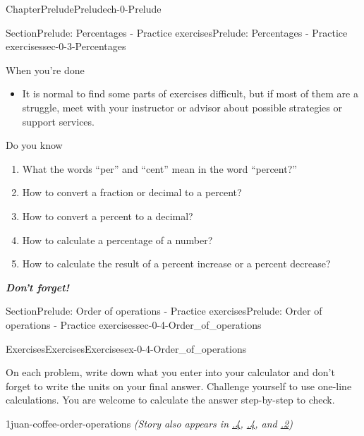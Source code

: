 \documentclass[twoside,11pt,]{book}
\newcommand{\xreffont}{\relax}
\newcommand{\alert}[1]{\textbf{\textit{#1}}}
\numberwithin{equation}{section}
\begin{document}
\begin{chapterptx}{Chapter}{Prelude}{}{Prelude}{}{}{ch-0-Prelude}
\begin{sectionptx}{Section}{Prelude: Percentages - Practice exercises}{}{Prelude: Percentages - Practice exercises}{}{}{sec-0-3-Percentages}
\begin{conclusion}{When you're done \textellipsis{}}
\begin{itemize}[label=\textbullet]
\item{}It is normal to find some parts of exercises difficult, but if most of them are a struggle, meet with your instructor or advisor about possible strategies or support services.%
\end{itemize}
%
\end{conclusion}%
\begin{conclusion}{Do you know \textellipsis{}}%
%
\begin{enumerate}[label={\Alph*.}]
\item{}What the words ``per'' and ``cent'' mean in the word ``percent?''%
\item{}How to convert a fraction or decimal to a percent?%
\item{}How to convert a percent to a decimal?%
\item{}How to calculate a percentage of a number?%
\item{}How to calculate the result of a percent increase or a percent decrease?%
\end{enumerate}
%
\par
\alert{Don't forget!}%
\end{conclusion}%
\end{sectionptx}
%
%
\typeout{************************************************}
\typeout{************************************************}
%
\begin{sectionptx}{Section}{Prelude: Order of operations - Practice exercises}{}{Prelude: Order of operations - Practice exercises}{}{}{sec-0-4-Order_of_operations}
%
%
\typeout{************************************************}
\typeout{************************************************}
%
\begin{exercises-subsection-numberless}{Exercises}{Exercises}{}{Exercises}{}{}{ex-0-4-Order_of_operations}
\begin{introduction}{}%
On each problem, write down what you enter into your calculator and don't forget to write the units on your final answer. Challenge yourself to use one-line calculations. You are welcome to calculate the answer step-by-step to check.%
\end{introduction}%
\begin{divisionexercise}{1}{}{}{juan-coffee-order-operations}%
\emph{(Story also appears in \hyperlink{juan-coffee-tables-graphs}{{\xreffont 1.2.4}}, \hyperlink{juan-coffee-first-look-linear}{{\xreffont 2.1.4}}, and \hyperlink{juan-coffee-systems-linear}{{\xreffont 4.2.2}})}%

\end{divisionexercise}
\end{exercises-subsection-numberless}
\end{sectionptx}
\end{chapterptx}
\end{document}
